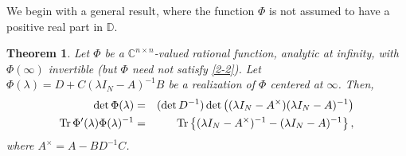 \documentclass[12pt]{amsart}
\newtheorem{thm}{Theorem}[section]
\theoremstyle{definition}
\theoremstyle{remark}
\numberwithin{equation}{section}
\begin{document}
We begin with a general result, where the function $\Phi$ is not assumed to have a positive real part in $\mathbb D$.




            \begin{thm}
              Let $\Phi$ be a $\mathbb C^{n\times n}$-valued rational function, analytic at infinity, with $\Phi(\infty)$ invertible (but $\Phi$ need not satisfy \eqref{2-2}).
              Let $\Phi({\lambda})=D+C({\lambda}I_N-A)^{-1}B$ be a realization of $\Phi$ centered at $\infty$. Then,
\begin{eqnarray}
  \label{eqas-1}
  \det\Phi({\lambda})&=&(\det D^{-1})\det\left(({\lambda}I_N-A^\times)({\lambda}I_N-A)^{-1}\right)\\
  {\rm Tr}\,\Phi^\prime({\lambda})\Phi({\lambda})^{-1}&=&{\rm Tr}\left\{({\lambda}I_N-A^\times)^{-1}-({\lambda}I_N-A)^{-1}\right\},
                                          \label{eqas-2}
\end{eqnarray}
where $A^\times=A-BD^{-1}C$.
            \end{thm}
\end{document}
